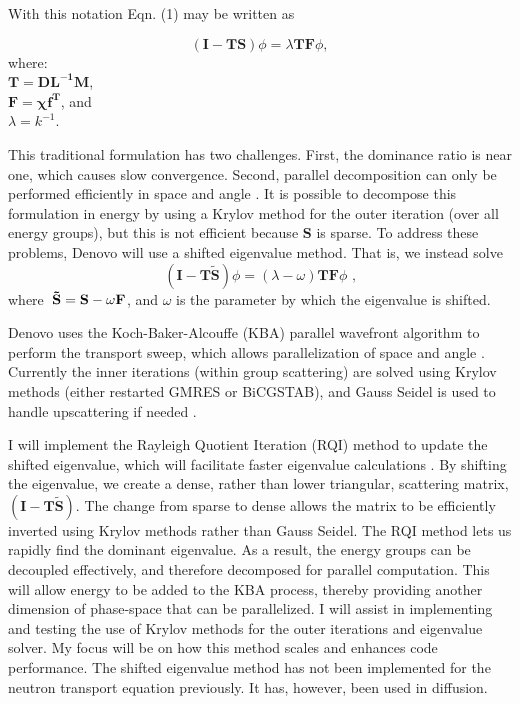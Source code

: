\documentclass[12pt, letterpaper]{article}
\begin{document}
\noindent With this notation Eqn. (1) may be written as
    
\begin{equation}
  (\mathbf{I} - \mathbf{TS}) \phi = \lambda\mathbf{TF}\phi,
\end{equation}
where: \\ 
\indent $\mathbf{T} =  \mathbf{DL^{-1}M}$, \\
\indent $\mathbf{F} = \boldsymbol{\chi}\mathbf{f^{T}}$, and \\
\indent $\lambda = k^{-1}$. 

    This traditional formulation has two challenges. First, the dominance ratio is near one, which causes slow convergence. Second, parallel decomposition can only be performed efficiently in space and angle \cite{Den}. It is possible to decompose this formulation in energy by using a Krylov method for the outer iteration (over all energy groups), but this is not efficient because $\mathbf{S}$ is sparse. To address these problems, Denovo will use a shifted eigenvalue method. That is, we instead solve 
\begin{equation}
  (\mathbf{I} - \mathbf{T\tilde{S}}) \phi = (\lambda - \omega) \mathbf{TF}\phi \text{ ,}
\end{equation}
where $\hspace{0.1cm}\mathbf{\tilde{S}} = \mathbf{S} - \omega\mathbf{F}$, and $\omega$ is the parameter by which the eigenvalue is shifted. 

    Denovo uses the Koch-Baker-Alcouffe (KBA) parallel wavefront algorithm to perform the transport sweep, which allows parallelization of space and angle \cite{kba}. Currently the inner iterations (within group scattering) are solved using Krylov methods (either restarted GMRES or BiCGSTAB), and Gauss Seidel is used to handle upscattering if needed \cite{Den}. 
    
    I will implement the Rayleigh Quotient Iteration (RQI) method to update the shifted eigenvalue, which will facilitate faster eigenvalue calculations \cite{rqi}. By shifting the eigenvalue, we create a dense, rather than lower triangular, scattering matrix, $(\mathbf{I} - \mathbf{T\tilde{S}})$. The change from sparse to dense allows the matrix to be efficiently inverted using Krylov methods rather than Gauss Seidel. The RQI method lets us rapidly find the dominant eigenvalue. As a result, the energy groups can be decoupled effectively, and therefore decomposed for parallel computation. This will allow energy to be added to the KBA process, thereby providing another dimension of phase-space that can be parallelized. I will assist in implementing and testing the use of Krylov methods for the outer iterations and eigenvalue solver. My focus will be on how this method scales and enhances code performance. The shifted eigenvalue method has not been implemented for the neutron transport equation previously. It has, however, been used in diffusion. 
\end{document}
